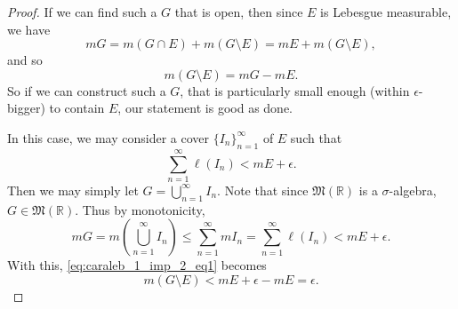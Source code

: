 \documentclass[notoc,notitlepage]{tufte-book}
\begin{document}
\begin{proof}
   If we can find such a $G$ that is open, then
  since $E$ is Lebesgue measurable, we have
  \begin{equation*}
    m G = m (G \cap E) + m (G \setminus E) = m E + m (G \setminus E),
  \end{equation*}
  and so
  \begin{equation}\label{eq:caraleb_1_imp_2_eq1}
    m (G \setminus E) = m G - m E.
  \end{equation}
  So if we can construct such a $G$, that is particularly small enough (within
  $\epsilon$-bigger) to contain $E$, our statement is good as done.

  \noindent
   In this case, we may consider a cover $\{
  I_n \}_{n=1}^{\infty}$ of $E$ such that
  \begin{equation*}
    \sum_{n=1}^{\infty} \ell(I_n) < m E + \epsilon.
  \end{equation*}
  Then we may simply let $G = \bigcup_{n=1}^{\infty} I_n$. Note that since
  $\mathfrak{M}(\mathbb{R})$ is a $\sigma$-algebra, $G \in
  \mathfrak{M}(\mathbb{R})$. Thus by monotonicity,
  \begin{equation*}
    m G = m \left( \bigcup_{n=1}^{\infty} I_n \right) \leq
    \sum_{n=1}^{\infty} m I_n = \sum_{n=1}^{\infty} \ell(I_n) < m E +
    \epsilon.
  \end{equation*}
  With this, \cref{eq:caraleb_1_imp_2_eq1} becomes
  \begin{equation*}
    m (G \setminus E) < m E + \epsilon - m E = \epsilon.
  \end{equation*}


\end{proof}
\end{document}

